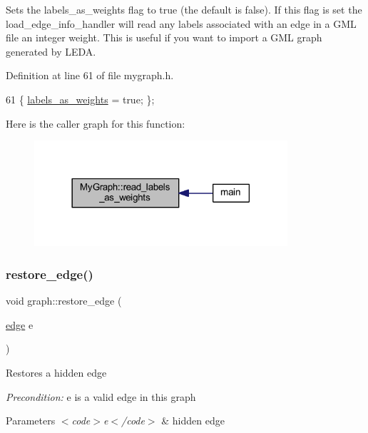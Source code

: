 Sets the labels\+\_\+as\+\_\+weights flag to true (the default is false). If this flag is set the {\ttfamily load\+\_\+edge\+\_\+info\+\_\+handler} will read any labels associated with an edge in a G\+ML file an integer weight. This is useful if you want to import a G\+ML graph generated by L\+E\+DA. 

Definition at line 61 of file mygraph.\+h.


\begin{DoxyCode}
61 \{ \mbox{\hyperlink{class_my_graph_a1c451264db5a154029533d9368b90317}{labels\_as\_weights}} = \textcolor{keyword}{true}; \};
\end{DoxyCode}
Here is the caller graph for this function\+:
\nopagebreak
\begin{figure}[H]
\begin{center}
\leavevmode
\includegraphics[width=266pt]{class_my_graph_a5d90ef0fba45bbbdf53a3bfe6f9a7061_icgraph}
\end{center}
\end{figure}
\mbox{\label{classgraph_a2e5426682a0897b9f9104b019970bedc}} 
\subsubsection{\texorpdfstring{restore\+\_\+edge()}{restore\_edge()}}
{\footnotesize\ttfamily void graph\+::restore\+\_\+edge (\begin{DoxyParamCaption}\item[{\mbox{\hyperlink{classedge}{edge}}}]{e }\end{DoxyParamCaption})\hspace{0.3cm}{\ttfamily [inherited]}}

Restores a hidden edge

{\itshape Precondition\+:} {\ttfamily e} is a valid edge in this graph


\begin{DoxyParams}{Parameters}
{\em $<$code$>$e$<$/code$>$} & hidden edge \\
\hline
\end{DoxyParams}


